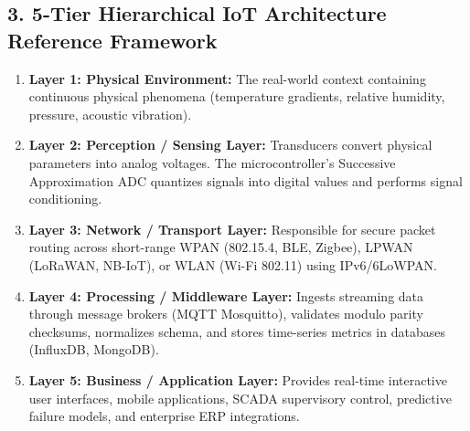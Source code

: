 \documentclass[11pt,a4paper]{article}
\begin{document}
\subsection*{3. 5-Tier Hierarchical IoT Architecture Reference Framework}
\begin{enumerate}[leftmargin=*]
    \item \textbf{Layer 1: Physical Environment:} The real-world context containing continuous physical phenomena (temperature gradients, relative humidity, pressure, acoustic vibration).
    \item \textbf{Layer 2: Perception / Sensing Layer:} Transducers convert physical parameters into analog voltages. The microcontroller's Successive Approximation ADC quantizes signals into digital values and performs signal conditioning.
    \item \textbf{Layer 3: Network / Transport Layer:} Responsible for secure packet routing across short-range WPAN (802.15.4, BLE, Zigbee), LPWAN (LoRaWAN, NB-IoT), or WLAN (Wi-Fi 802.11) using IPv6/6LoWPAN.
    \item \textbf{Layer 4: Processing / Middleware Layer:} Ingests streaming data through message brokers (MQTT Mosquitto), validates modulo parity checksums, normalizes schema, and stores time-series metrics in databases (InfluxDB, MongoDB).
    \item \textbf{Layer 5: Business / Application Layer:} Provides real-time interactive user interfaces, mobile applications, SCADA supervisory control, predictive failure models, and enterprise ERP integrations.
\end{enumerate}
\end{document}
